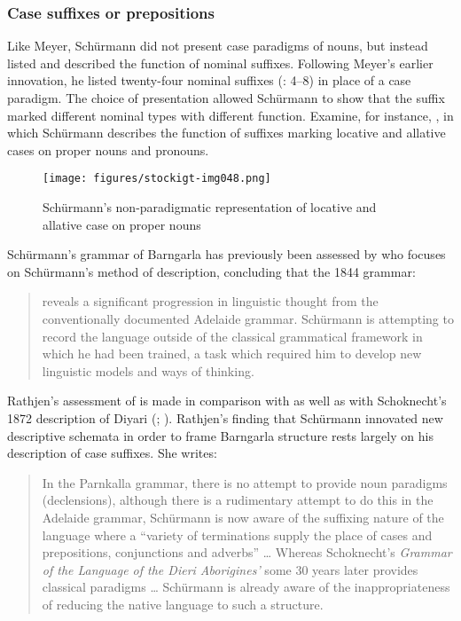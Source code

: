 \subsubsection{Case suffixes or prepositions}
\label{sec:key:6.2.1.1}\label{bkm:Ref456091421}

Like Meyer, Schürmann did not present case paradigms of nouns, but instead listed and described the function of nominal suffixes. Following Meyer’s earlier innovation, he listed twenty-four nominal suffixes (\citeyear{schurmann_letter_1844}: 4--8) in place of a case paradigm. The choice of presentation allowed Schürmann to show that the suffix marked different nominal types with different function. Examine, for instance, , in which Schürmann describes the function of suffixes marking locative and allative cases on proper nouns and pronouns.


\begin{figure}
\texttt{[image: figures/stockigt-img048.png]}
\caption{Schürmann’s non-paradigmatic representation of locative and allative case on proper nouns \citeyearpar[6]{schurmann_vocabulary_1844}}
\label{fig:key:106}
\end{figure}

Schürmann’s grammar of Barngarla \citeyearpar{schurmann_vocabulary_1844} has previously been assessed by \citet[83--88]{rathjen_difficult_1998} who focuses on Schürmann’s method of description, concluding that the 1844 grammar:

\begin{quote}
reveals a significant progression in linguistic thought from the conventionally documented Adelaide grammar. Schürmann is attempting to record the language outside of the classical grammatical framework in which he had been trained, a task which required him to develop new linguistic models and ways of thinking. \citep[88]{rathjen_difficult_1998}
\end{quote}

Rathjen’s assessment of \citet{schurmann_letter_1844} is made in comparison with \citet{teichelmann_outlines_1840} as well as with Schoknecht’s 1872 description of Diyari (\citealt{schoknecht1872}; ). Rathjen’s finding that Schürmann innovated new descriptive schemata in order to frame Barngarla structure rests largely on his description of case suffixes. She writes:

\begin{quote}
	In the Parnkalla grammar, there is no attempt to provide noun paradigms (declensions), although there is a rudimentary attempt to do this in the Adelaide grammar, Schürmann is now aware of the suffixing nature of the language where a “variety of terminations supply the place of cases and prepositions, conjunctions and adverbs” … Whereas Schoknecht’s \textit{Grammar of the Language of the Dieri Aborigines’} some 30 years later provides classical paradigms … Schürmann is already aware of the inappropriateness of reducing the native language to such a structure. \citep[86]{rathjen_difficult_1998}
\end{quote}

